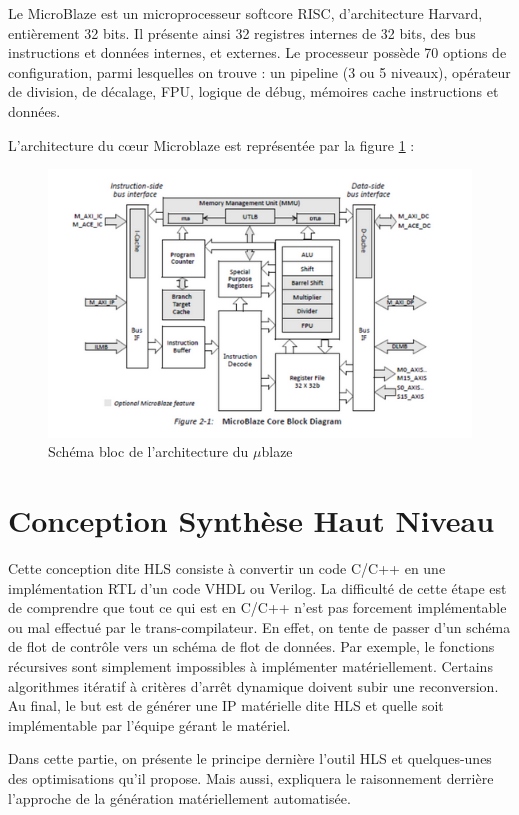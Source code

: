 \documentclass[12pt,a4paper]{ieee}
\begin{document}
Le MicroBlaze est un microprocesseur softcore RISC, d'architecture Harvard, entièrement 32 bits. Il présente ainsi 32 registres internes de 32 bits, des bus instructions et données internes, et externes.
Le processeur possède 70 options de configuration, parmi lesquelles on trouve : un pipeline (3 ou 5 niveaux), opérateur de division, de décalage, FPU, logique de débug, mémoires cache instructions et données.

L’architecture du cœur Microblaze est représentée par la figure \ref{fig:screenshot004} :
\begin{figure}[H]
	\centering
	\includegraphics[trim= 0  20 0 0,clip,width=0.8\linewidth]{soft/screenshot004}
	\caption{Schéma bloc de l'architecture du $\mu$blaze}
	\label{fig:screenshot004}
\end{figure}


\section{Conception Synthèse Haut Niveau}
Cette conception dite HLS consiste à convertir un code C/C++ en une implémentation RTL d'un code VHDL ou Verilog. La difficulté de cette étape est de comprendre que tout ce qui est en C/C++ n'est pas forcement implémentable ou mal effectué par le trans-compilateur. En effet, on tente de passer d'un schéma de flot de contrôle vers un schéma de flot de données. Par exemple, le fonctions récursives sont simplement impossibles à implémenter matériellement. Certains algorithmes itératif à critères d'arrêt dynamique doivent subir une reconversion. Au final, le but est de générer une IP matérielle dite HLS et quelle soit implémentable par l'équipe gérant le matériel.

Dans cette partie, on présente le principe dernière l'outil HLS et quelques-unes des optimisations qu'il propose. Mais aussi, expliquera le raisonnement derrière l'approche de la génération matériellement automatisée.
\end{document}
